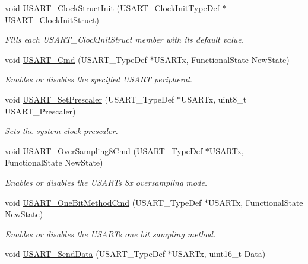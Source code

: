 \begin{DoxyCompactItemize}
void \mbox{\hyperlink{group___u_s_a_r_t_ga59df27d0adda18b16ee28d47672cc724}{U\+S\+A\+R\+T\+\_\+\+Clock\+Struct\+Init}} (\mbox{\hyperlink{struct_u_s_a_r_t___clock_init_type_def}{U\+S\+A\+R\+T\+\_\+\+Clock\+Init\+Type\+Def}} $\ast$U\+S\+A\+R\+T\+\_\+\+Clock\+Init\+Struct)
\begin{DoxyCompactList}\small\item\em Fills each U\+S\+A\+R\+T\+\_\+\+Clock\+Init\+Struct member with its default value. \end{DoxyCompactList}\item 
void \mbox{\hyperlink{group___u_s_a_r_t_ga45e51626739c5f22a6567c8a85d1d85e}{U\+S\+A\+R\+T\+\_\+\+Cmd}} (U\+S\+A\+R\+T\+\_\+\+Type\+Def $\ast$U\+S\+A\+R\+Tx, Functional\+State New\+State)
\begin{DoxyCompactList}\small\item\em Enables or disables the specified U\+S\+A\+RT peripheral. \end{DoxyCompactList}\item 
void \mbox{\hyperlink{group___u_s_a_r_t_gaf5da8f2eee8245425584d85d4f62cc33}{U\+S\+A\+R\+T\+\_\+\+Set\+Prescaler}} (U\+S\+A\+R\+T\+\_\+\+Type\+Def $\ast$U\+S\+A\+R\+Tx, uint8\+\_\+t U\+S\+A\+R\+T\+\_\+\+Prescaler)
\begin{DoxyCompactList}\small\item\em Sets the system clock prescaler. \end{DoxyCompactList}\item 
void \mbox{\hyperlink{group___u_s_a_r_t_ga3897bab07491d9239f8a238a9a7cddea}{U\+S\+A\+R\+T\+\_\+\+Over\+Sampling8\+Cmd}} (U\+S\+A\+R\+T\+\_\+\+Type\+Def $\ast$U\+S\+A\+R\+Tx, Functional\+State New\+State)
\begin{DoxyCompactList}\small\item\em Enables or disables the U\+S\+A\+RT\textquotesingle{}s 8x oversampling mode. \end{DoxyCompactList}\item 
void \mbox{\hyperlink{group___u_s_a_r_t_ga3ed89ea8765d851510cfe90f7d90cbbb}{U\+S\+A\+R\+T\+\_\+\+One\+Bit\+Method\+Cmd}} (U\+S\+A\+R\+T\+\_\+\+Type\+Def $\ast$U\+S\+A\+R\+Tx, Functional\+State New\+State)
\begin{DoxyCompactList}\small\item\em Enables or disables the U\+S\+A\+RT\textquotesingle{}s one bit sampling method. \end{DoxyCompactList}\item 
void \mbox{\hyperlink{group___u_s_a_r_t_ga0b43d42da9540f446d494bf69823c6fb}{U\+S\+A\+R\+T\+\_\+\+Send\+Data}} (U\+S\+A\+R\+T\+\_\+\+Type\+Def $\ast$U\+S\+A\+R\+Tx, uint16\+\_\+t Data)

\end{DoxyCompactItemize}
